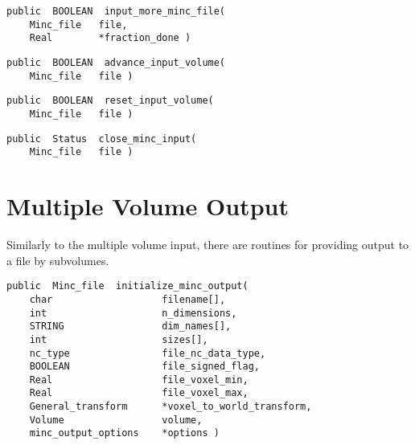 {\bf\begin{verbatim}
public  BOOLEAN  input_more_minc_file(
    Minc_file   file,
    Real        *fraction_done )
\end{verbatim}}


{\bf\begin{verbatim}
public  BOOLEAN  advance_input_volume(
    Minc_file   file )
\end{verbatim}}


{\bf\begin{verbatim}
public  BOOLEAN  reset_input_volume(
    Minc_file   file )
\end{verbatim}}


{\bf\begin{verbatim}
public  Status  close_minc_input(
    Minc_file   file )
\end{verbatim}}


\section{Multiple Volume Output}

Similarly to the multiple volume input, there are routines for
providing output to a file by subvolumes.

{\bf\begin{verbatim}
public  Minc_file  initialize_minc_output(
    char                   filename[],
    int                    n_dimensions,
    STRING                 dim_names[],
    int                    sizes[],
    nc_type                file_nc_data_type,
    BOOLEAN                file_signed_flag,
    Real                   file_voxel_min,
    Real                   file_voxel_max,
    General_transform      *voxel_to_world_transform,
    Volume                 volume,
    minc_output_options    *options )
\end{verbatim}}

